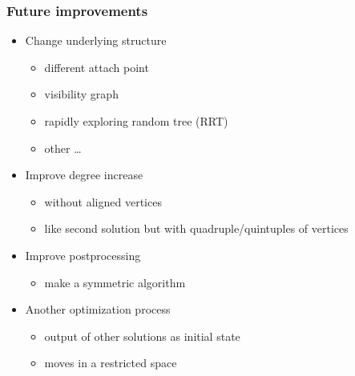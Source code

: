 
\begin{frame}
  \frametitle{Future improvements}
  \begin{itemize}
  \item Change underlying \alert{structure}\pause
    \begin{itemize}
    \item different \alert{attach point}\pause
    \item visibility graph\pause
    \item rapidly exploring random tree (RRT)\pause
    \item other \dots\pause
    \end{itemize}
  \item Improve \alert{degree} increase\pause
    \begin{itemize}
    \item without \alert{aligned} vertices\pause
    \item like second solution but with quadruple/quintuples
      of vertices\pause
    \end{itemize}
  \item Improve \alert{postprocessing}\pause
    \begin{itemize}
    \item make a \alert{symmetric} algorithm\pause
    \end{itemize}
  \item Another \alert{optimization} process\pause
    \begin{itemize}
    \item output of other solutions as initial state\pause
    \item moves in a restricted space
    \end{itemize}
  \end{itemize}
\end{frame}


